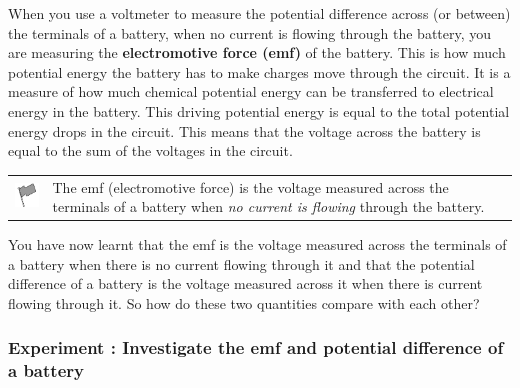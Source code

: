         
        \label{m38772*id64666}When you use a voltmeter to measure the potential difference across (or between) the terminals of a battery, when no current is flowing through the battery, you are measuring the \textbf{electromotive force (emf)} of the battery. This is how much potential energy the battery has to make charges move through the circuit. It is a measure of how much chemical potential energy can be transferred to electrical energy in the battery. This driving potential energy is equal to the total potential energy drops in the circuit. This means that the voltage across the battery is equal to the sum of the voltages in the circuit.

\vspace{\rubberspace}\par
        \label{m38772*emf}\begin{definition}
	  \begin{tabular*}{15 cm}{m{15 mm}m{}}
	\hspace*{-50pt}  \includegraphics[width=0.5in]{col11305.imgs/psflag2.png}   & \Definition{   \label{id2479864}\textbf{emf}} { \label{m38772*emf1meaning}
The emf (electromotive force) is the voltage measured across the terminals of a battery when \textsl{no current is flowing} through the battery.
 } 
      \end{tabular*}
      \end{definition}
\par 

	\label{m38772*ffgfgfgf}
	  You have now learnt that the emf is the voltage measured across the terminals of a battery when there is no current flowing through it and that the potential difference of a battery is the voltage measured across it when there is current flowing through it. So how do these two quantities compare with each other? 
	\par   

	\label{m38772*secfhsst!!!underscore!!!id1616s1}
            \subsubsection{ Experiment : Investigate the emf and potential difference of a battery }
            \nopagebreak
            
